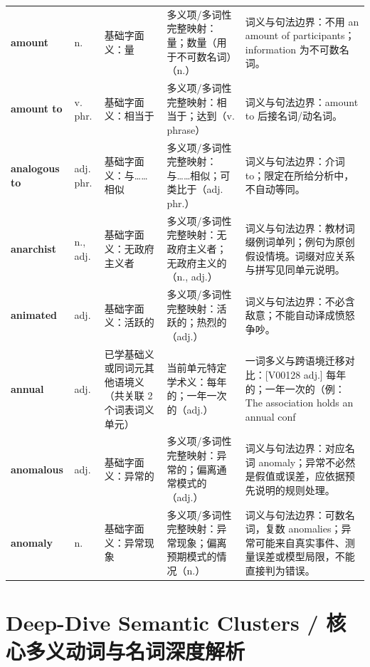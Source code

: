 \begin{longtable}{>{\raggedright\arraybackslash}p{2.5cm}>{\raggedright\arraybackslash}p{1.6cm}>{\raggedright\arraybackslash}p{3.2cm}>{\raggedright\arraybackslash}p{3.6cm}>{\raggedright\arraybackslash}p{3.3cm}}
\textbf{amount} & n. & 基础字面义：量 & 多义项/多词性完整映射：量；数量（用于不可数名词）（n.） & 词义与句法边界：不用 an amount of participants；information 为不可数名词。 \tabularnewline
\textbf{amount to} & v. phr. & 基础字面义：相当于 & 多义项/多词性完整映射：相当于；达到（v. phrase） & 词义与句法边界：amount to 后接名词/动名词。 \tabularnewline
\textbf{analogous to} & adj. phr. & 基础字面义：与……相似 & 多义项/多词性完整映射：与……相似；可类比于（adj. phr.） & 词义与句法边界：介词to；限定在所给分析中，不自动等同。 \tabularnewline
\textbf{anarchist} & n., adj. & 基础字面义：无政府主义者 & 多义项/多词性完整映射：无政府主义者；无政府主义的（n., adj.） & 词义与句法边界：教材词缀例词单列；例句为原创假设情境。词缀对应关系与拼写见同单元说明。 \tabularnewline
\textbf{animated} & adj. & 基础字面义：活跃的 & 多义项/多词性完整映射：活跃的；热烈的（adj.） & 词义与句法边界：不必含敌意；不能自动译成愤怒争吵。 \tabularnewline
\textbf{annual} & adj. & 已学基础义或同词元其他语境义（共关联 2 个词表词义单元） & 当前单元特定学术义：每年的；一年一次的（adj.） & 一词多义与跨语境迁移对比：[V00128 adj.] 每年的；一年一次的（例：The association holds an annual conf \tabularnewline
\textbf{anomalous} & adj. & 基础字面义：异常的 & 多义项/多词性完整映射：异常的；偏离通常模式的（adj.） & 词义与句法边界：对应名词 anomaly；异常不必然是假值或误差，应依据预先说明的规则处理。 \tabularnewline
\textbf{anomaly} & n. & 基础字面义：异常现象 & 多义项/多词性完整映射：异常现象；偏离预期模式的情况（n.） & 词义与句法边界：可数名词，复数 anomalies；异常可能来自真实事件、测量误差或模型局限，不能直接判为错误。 \tabularnewline
\bottomrule
\end{longtable}
\endgroup

\section{Deep-Dive Semantic Clusters / 核心多义动词与名词深度解析}
